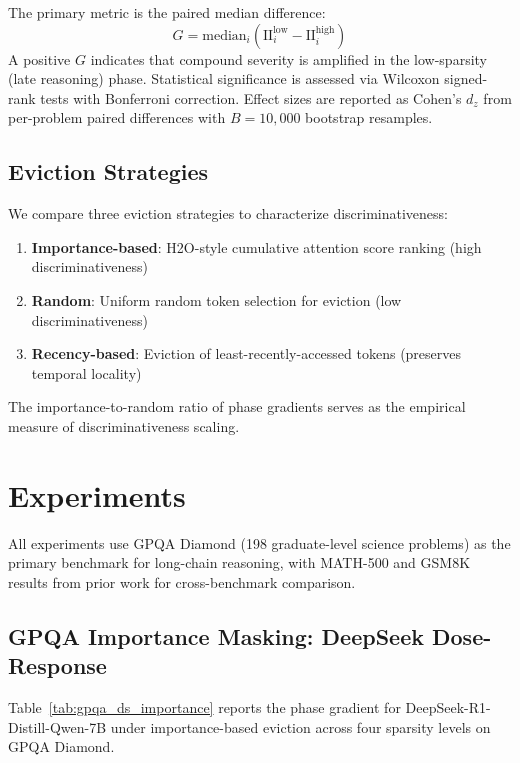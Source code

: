 \documentclass[11pt,a4paper]{article}
\begin{document}
The primary metric is the paired median difference:
\begin{equation}
    G = \text{median}_i(\text{II}^{\text{low}}_i - \text{II}^{\text{high}}_i)
\end{equation}
A positive $G$ indicates that compound severity is amplified in the low-sparsity (late reasoning) phase. Statistical significance is assessed via Wilcoxon signed-rank tests with Bonferroni correction. Effect sizes are reported as Cohen's $d_z$ from per-problem paired differences with $B=10{,}000$ bootstrap resamples.

\subsection{Eviction Strategies}

We compare three eviction strategies to characterize discriminativeness:
\begin{enumerate}
    \item \textbf{Importance-based}: H2O-style cumulative attention score ranking (high discriminativeness)
    \item \textbf{Random}: Uniform random token selection for eviction (low discriminativeness)
    \item \textbf{Recency-based}: Eviction of least-recently-accessed tokens (preserves temporal locality)
\end{enumerate}

The importance-to-random ratio of phase gradients serves as the empirical measure of discriminativeness scaling.

\section{Experiments}

All experiments use GPQA Diamond (198 graduate-level science problems) as the primary benchmark for long-chain reasoning, with MATH-500 and GSM8K results from prior work for cross-benchmark comparison.

\subsection{GPQA Importance Masking: DeepSeek Dose-Response}

Table~\ref{tab:gpqa_ds_importance} reports the phase gradient for DeepSeek-R1-Distill-Qwen-7B under importance-based eviction across four sparsity levels on GPQA Diamond.
\end{document}
